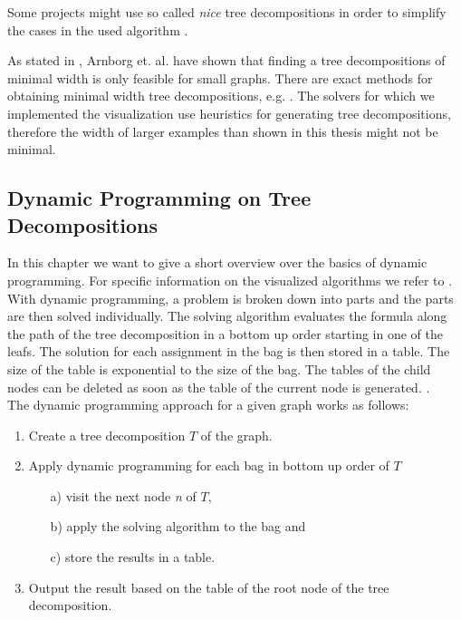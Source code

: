 \documentclass[a4paper, 12pt, bibliography=totoc]{scrartcl}
\begin{document}
Some projects might use so called \textit{nice} tree decompositions in order to simplify the cases in the used algorithm \cite[Ch.~2.2]{DiplomarbeitZisser}.

As stated in \cite[Ch.~2.2]{DiplomarbeitZisser}, Arnborg et. al. \cite{arnborgtd} have shown that finding a tree decompositions of minimal width is only feasible for small graphs.  There are exact methods for obtaining minimal width tree decompositions,  e.g. \cite{gogatetw, bachoore06}. The solvers for which we implemented the visualization use heuristics  for  generating tree decompositions, therefore  the width of larger examples than shown in this thesis might not be minimal. 


\subsection{Dynamic Programming on Tree Decompositions}
In this chapter we want to give a short overview over the basics of dynamic programming. For specific information on the visualized algorithms we refer to \cite{DiplomarbeitZisser, samermodelcounting, dpdbpadl2020}. \\

With dynamic programming, a problem is broken down into parts and the parts are then solved individually. The solving algorithm evaluates the formula along the path of the tree decomposition in a bottom up order starting in one of the leafs. The solution for each assignment in the bag is then stored in a table. The size of the table is exponential to the size of the bag. The tables of the child nodes can be deleted as soon as the table of the current node is generated. \cite[Ch. 3.1]{DiplomarbeitZisser}.\\

The dynamic programming approach for a given graph works as follows:
\begin{enumerate}
	\filbreak
	\item Create a tree decomposition ${T}$ of the graph.
	\item Apply dynamic programming for each bag in bottom up order of ${T}$
	\begin{itemize}
		\item[a)] visit the next node \textit{n} of ${T}$,
		\item[b)] apply the solving algorithm to the bag and
		\item[c)] store the results in a table.
	\end{itemize}
	\item Output the result based on the table of the root node of the tree decomposition.
\end{enumerate}
\end{document}
